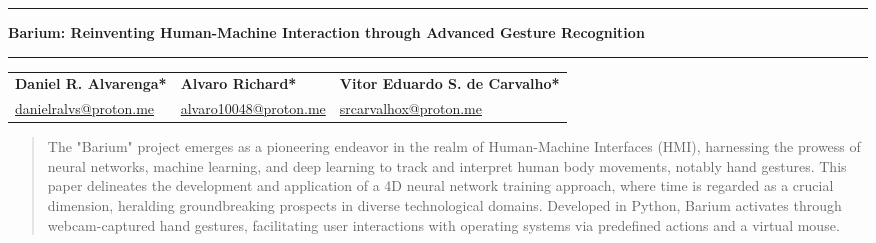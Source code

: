 \documentclass{article}
\begin{document}
\noindent\rule{\textwidth}{1pt} %

\begin{center}
    \Large \textbf{Barium: Reinventing Human-Machine Interaction through Advanced Gesture Recognition} %
\end{center}

\noindent\rule{\textwidth}{3pt} %

\bigskip %

\begin{center}
   \begin{tabular}{p{}p{}p{}}
        \centering \textbf{Daniel R. Alvarenga*} & \centering \textbf{Alvaro Richard*} & \centering \textbf{Vitor Eduardo S. de Carvalho*} \tabularnewline
        \centering \href{mailto:danielralvs@proton.me}{danielralvs@proton.me} & \centering \href{mailto:alvarorichards@proton.me}{alvaro10048@proton.me} & \centering \href{mailto:srcarvalhox@proton.me}{srcarvalhox@proton.me} \tabularnewline
    \end{tabular}
\end{center}

\bigskip %

\begin{abstract}
The "Barium" project emerges as a pioneering endeavor in the realm of Human-Machine Interfaces (HMI), harnessing the prowess of neural networks, machine learning, and deep learning to track and interpret human body movements, notably hand gestures. This paper delineates the development and application of a 4D neural network training approach, where time is regarded as a crucial dimension, heralding groundbreaking prospects in diverse technological domains. Developed in Python, Barium activates through webcam-captured hand gestures, facilitating user interactions with operating systems via predefined actions and a virtual mouse.
\end{abstract}


\end{document}
